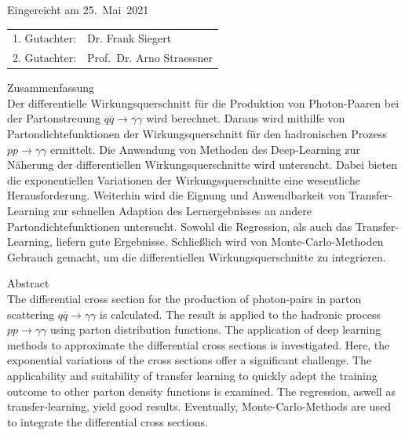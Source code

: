 \thispagestyle{empty}\vspace*{48em}

Eingereicht am 25.~Mai~2021\vspace{1.5em}
\par{\large\begin{tabular}{ll}
 1. Gutachter: & Dr. Frank Siegert \\
 2. Gutachter: & Prof.~Dr. Arno Straessner \\
\end{tabular}}


\newpage
\thispagestyle{empty}

Zusammenfassung \\
Der differentielle Wirkungsquerschnitt für die Produktion von Photon-Paaren bei der Partonstreuung $q\overline{q} \rightarrow \gamma \gamma$ wird berechnet. Daraus wird mithilfe von Partondichtefunktionen der Wirkungsquerschnitt für den hadronischen Prozess $pp \rightarrow \gamma \gamma$ ermittelt. Die Anwendung von Methoden des Deep-Learning zur Näherung der differentiellen Wirkungsquerschnitte wird untersucht. Dabei bieten die exponentiellen Variationen der Wirkungsquerschnitte eine wesentliche Herausforderung.
Weiterhin wird die Eignung und Anwendbarkeit von Transfer-Learning zur schnellen Adaption des Lernergebnisses an andere Partondichtefunktionen untersucht. Sowohl die Regression, als auch das Transfer-Learning, liefern gute Ergebnisse. Schließlich wird von Monte-Carlo-Methoden Gebrauch gemacht, um die differentiellen Wirkungsquerschnitte zu integrieren.


\vspace{20em}
Abstract \\ 
The differential cross section for the production of photon-pairs in parton scattering $q\overline{q} \rightarrow \gamma \gamma$ is calculated. The result is applied to the hadronic process $pp \rightarrow \gamma \gamma$ using parton distribution functions. The application of deep learning methods to approximate the differential cross sections is investigated. Here, the exponential variations of the cross sections offer a significant challenge. The applicability and suitability of transfer learning to quickly adept the training outcome to other parton density functions is examined. The regression, aswell as transfer-learning, yield good results. Eventually, Monte-Carlo-Methods are used to integrate the differential cross sections. 
 
